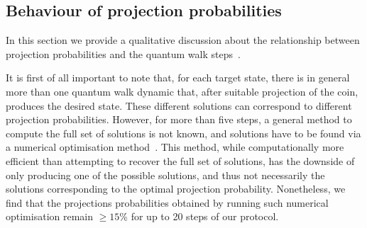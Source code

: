 \subsection{Behaviour of projection probabilities}

In this section we provide a qualitative discussion about the relationship between projection probabilities and the quantum walk steps~\cite{innocenti2017quantum}.

It is first of all important to note that, for each target state, there is in general more than one quantum walk dynamic that, after suitable projection of the coin, produces the desired state.
These different solutions can correspond to different projection probabilities.
However, for more than five steps, a general method to compute the full set of solutions is not known, and solutions have to be found via a numerical optimisation method~\cite{innocenti2017quantum}.
This method, while computationally more efficient than attempting to recover the full set of solutions, has the downside of only producing one of the possible solutions, and thus not necessarily the solutions corresponding to the optimal projection probability.
Nonetheless, we find that the projections probabilities obtained by running such numerical optimisation remain $\ge 15\%$ for up to 20 steps of our protocol. 

